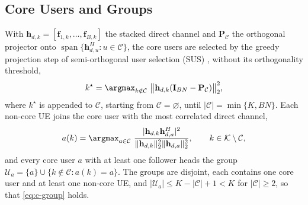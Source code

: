 \subsection{Core Users and Groups}
With $\mathbf h_{d,k}=[\mathbf f_{1,k},\ldots,\mathbf f_{B,k}]$ the stacked direct channel and $\mathbf P_{\mathcal C}$ the orthogonal projector onto $\operatorname{span}\{\mathbf h_{d,u}^H:u\in\mathcal C\}$, the core users are selected by the greedy projection step of semi-orthogonal user selection (SUS) \cite{Yoo2006semiorthogonal}, without its orthogonality threshold,
\begin{equation}\label{eq:core_selection}
k^\star=\argmax_{k\notin\mathcal C}\ \bigl\|\mathbf h_{d,k}(\mathbf I_{BN}-\mathbf P_{\mathcal C})\bigr\|_2^2 ,
\end{equation}
where $k^\star$ is appended to $\mathcal C$, starting from $\mathcal C=\varnothing$, until $|\mathcal C|=\min\{K,BN\}$. Each non-core UE joins the core user with the most correlated direct channel,
\begin{equation}\label{eq:nearest_core}
a(k)=\argmax_{a\in\mathcal C}\ \frac{|\mathbf h_{d,k}\mathbf h_{d,a}^H|^2}{\|\mathbf h_{d,k}\|_2^2\|\mathbf h_{d,a}\|_2^2},\qquad k\in\mathcal K\setminus\mathcal C,
\end{equation}
and every core user $a$ with at least one follower heads the group $\mathcal U_a=\{a\}\cup\{k\notin\mathcal C:a(k)=a\}$. The groups are disjoint, each contains one core user and at least one non-core UE, and $|\mathcal U_a|\le K-|\mathcal C|+1<K$ for $|\mathcal C|\ge2$, so that \eqref{eq:c-group} holds.

